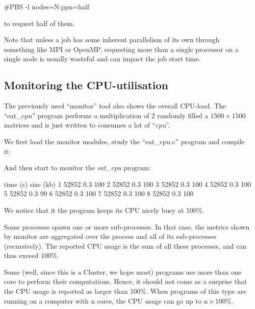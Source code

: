 \begin{prompt}
#PBS -l nodes=N:ppn=half
\end{prompt}

  to request half of them.
\fi

Note that unless a job has some inherent parallelism of
its own through something like MPI or OpenMP, requesting more than a single
processor on a single node is usually wasteful and can impact the job start
time.

\subsection{Monitoring the CPU-utilisation}

\ifgent
\else
  The previously used ``monitor'' tool also shows the overall CPU-load. The
  ``eat\_cpu'' program performs a multiplication of 2 randomly filled a $1500 \times 1500$
  matrices and is just written to consumes a lot of ``\emph{cpu}''.

  We first load the monitor modules, study the ``eat\_cpu.c'' program and compile it:
\begin{prompt}
\end{prompt}

  And then start to monitor the \emph{eat\_cpu} program:

\begin{prompt}
time  (s) size (kb) %
1  52852  0.3 100
2  52852  0.3 100
3  52852  0.3 100
4  52852  0.3 100
5  52852  0.3  99
6  52852  0.3 100
7  52852  0.3 100
8  52852  0.3 100
\end{prompt}

  We notice that it the program keeps its CPU nicely busy at 100\%.

  Some processes spawn one or more sub-processes. In that case, the metrics shown
  by monitor are aggregated over the process and all of its sub-processes
  (recursively). The reported CPU usage is the sum of all these processes, and
  can thus exceed 100\%.

  Some (well, since this is a \hpc Cluster, we hope most) programs use more
  than one core to perform their computations. Hence, it should not come as a
  surprise that the CPU usage is reported as larger than 100\%. When programs of
  this type are running on a computer with n cores, the CPU usage can go up to $\text{n}
  \times 100\%$.
\fi

